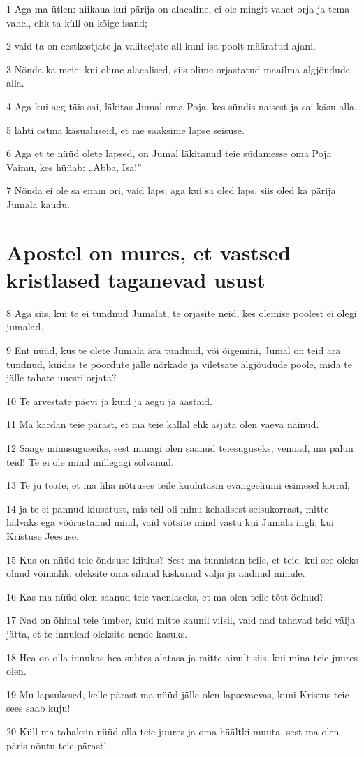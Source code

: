 \par 1 Aga ma ütlen: niikaua kui pärija on alaealine, ei ole mingit vahet orja ja tema vahel, ehk ta küll on kõige isand;
\par 2 vaid ta on eestkostjate ja valitsejate all kuni isa poolt määratud ajani.
\par 3 Nõnda ka meie: kui olime alaealised, siis olime orjastatud maailma algjõudude alla.
\par 4 Aga kui aeg täis sai, läkitas Jumal oma Poja, kes sündis naisest ja sai käsu alla,
\par 5 lahti ostma käsualuseid, et me saaksime lapse seisuse.
\par 6 Aga et te nüüd olete lapsed, on Jumal läkitanud teie südamesse oma Poja Vaimu, kes hüüab: „Abba, Isa!”
\par 7 Nõnda ei ole sa enam ori, vaid laps; aga kui sa oled laps, siis oled ka pärija Jumala kaudu.

\section*{Apostel on mures, et vastsed kristlased taganevad usust}

\par 8 Aga siis, kui te ei tundnud Jumalat, te orjasite neid, kes olemise poolest ei olegi jumalad.
\par 9 Ent nüüd, kus te olete Jumala ära tundnud, või õigemini, Jumal on teid ära tundnud, kuidas te pöördute jälle nõrkade ja viletsate algjõudude poole, mida te jälle tahate uuesti orjata?
\par 10 Te arvestate päevi ja kuid ja aegu ja aastaid.
\par 11 Ma kardan teie pärast, et ma teie kallal ehk asjata olen vaeva näinud.
\par 12 Saage minusuguseiks, sest minagi olen saanud teiesuguseks, vennad, ma palun teid! Te ei ole mind millegagi solvanud.
\par 13 Te ju teate, et ma liha nõtruses teile kuulutasin evangeeliumi esimesel korral,
\par 14 ja te ei pannud kiusatust, mis teil oli minu kehalisest seisukorrast, mitte halvaks ega võõrastanud mind, vaid võtsite mind vastu kui Jumala ingli, kui Kristuse Jeesuse.
\par 15 Kus on nüüd teie õndsuse kiitlus? Sest ma tunnistan teile, et teie, kui see oleks olnud võimalik, oleksite oma silmad kiskunud välja ja andnud minule.
\par 16 Kas ma nüüd olen saanud teie vaenlaseks, et ma olen teile tõtt öelnud?
\par 17 Nad on õhinal teie ümber, kuid mitte kaunil viisil, vaid nad tahavad teid välja jätta, et te innukad oleksite nende kasuks.
\par 18 Hea on olla innukas hea suhtes alatasa ja mitte ainult siis, kui mina teie juures olen.
\par 19 Mu lapsukesed, kelle pärast ma nüüd jälle olen lapsevaevas, kuni Kristus teie sees saab kuju!
\par 20 Küll ma tahaksin nüüd olla teie juures ja oma häältki muuta, sest ma olen päris nõutu teie pärast!

